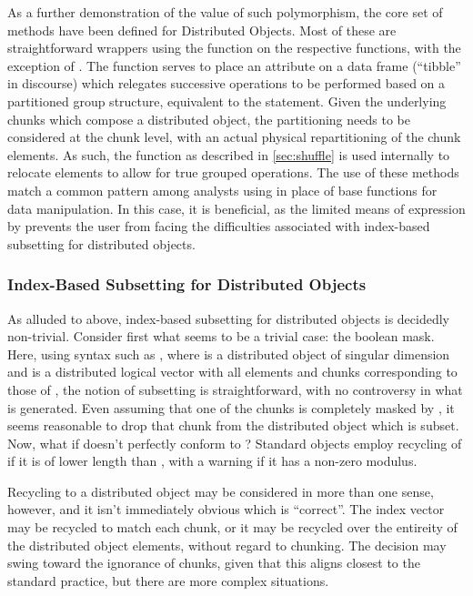 As a further demonstration of the value of such polymorphism, the core set of  methods have been defined for Distributed Objects.
Most of these are straightforward wrappers using the  function on the respective  functions, with the exception of .
The  function serves to place an attribute on a data frame (``tibble'' in  discourse) which relegates successive operations to be performed based on a partitioned group structure, equivalent to the   statement.
Given the underlying chunks which compose a distributed object, the partitioning needs to be considered at the chunk level, with an actual physical repartitioning of the chunk elements.
As such, the  function as described in \cref{sec:shuffle} is used internally to relocate elements to allow for true grouped operations.
The use of these methods match a common pattern among analysts using  in place of base \R{} functions for data manipulation.
In this case, it is beneficial, as the limited means of expression by  prevents the user from facing the difficulties associated with index-based subsetting for distributed objects.

\subsubsection{Index-Based Subsetting for Distributed Objects}

As alluded to above, index-based subsetting for distributed objects is decidedly non-trivial.
Consider first what seems to be a trivial case: the boolean mask.
Here, using syntax such as , where  is a distributed object of singular dimension and  is a distributed logical vector with all elements and chunks corresponding to those of , the notion of subsetting is straightforward, with no controversy in what is generated.
Even assuming that one of the chunks is completely masked by , it seems reasonable to drop that chunk from the distributed object which is subset.
Now, what if  doesn't perfectly conform to ?
Standard \R{} objects employ recycling of  if it is of lower length than , with a warning if it has a non-zero modulus.

Recycling to a distributed object may be considered in more than one sense, however, and it isn't immediately obvious which is ``correct''.
The index vector may be recycled to match each chunk, or it may be recycled over the entireity of the distributed object elements, without regard to chunking.
The decision may swing toward the ignorance of chunks, given that this aligns closest to the standard \R{} practice, but there are more complex situations.

